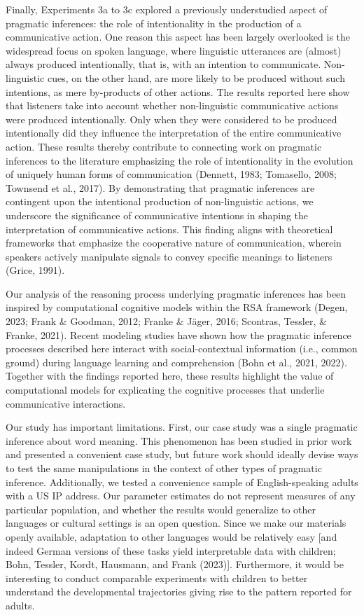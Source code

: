 \documentclass[
  man,floatsintext]{apa6}
\begin{document}
Finally, Experiments 3a to 3c explored a previously understudied aspect of pragmatic inferences: the role of intentionality in the production of a communicative action. One reason this aspect has been largely overlooked is the widespread focus on spoken language, where linguistic utterances are (almost) always produced intentionally, that is, with an intention to communicate. Non-linguistic cues, on the other hand, are more likely to be produced without such intentions, as mere by-products of other actions. The results reported here show that listeners take into account whether non-linguistic communicative actions were produced intentionally. Only when they were considered to be produced intentionally did they influence the interpretation of the entire communicative action. These results thereby contribute to connecting work on pragmatic inferences to the literature emphasizing the role of intentionality in the evolution of uniquely human forms of communication (Dennett, 1983; Tomasello, 2008; Townsend et al., 2017). By demonstrating that pragmatic inferences are contingent upon the intentional production of non-linguistic actions, we underscore the significance of communicative intentions in shaping the interpretation of communicative actions. This finding aligns with theoretical frameworks that emphasize the cooperative nature of communication, wherein speakers actively manipulate signals to convey specific meanings to listeners (Grice, 1991).

Our analysis of the reasoning process underlying pragmatic inferences has been inspired by computational cognitive models within the RSA framework (Degen, 2023; Frank \& Goodman, 2012; Franke \& Jäger, 2016; Scontras, Tessler, \& Franke, 2021). Recent modeling studies have shown how the pragmatic inference processes described here interact with social-contextual information (i.e., common ground) during language learning and comprehension (Bohn et al., 2021, 2022). Together with the findings reported here, these results highlight the value of computational models for explicating the cognitive processes that underlie communicative interactions.

Our study has important limitations. First, our case study was a single pragmatic inference about word meaning. This phenomenon has been studied in prior work and presented a convenient case study, but future work should ideally devise ways to test the same manipulations in the context of other types of pragmatic inference. Additionally, we tested a convenience sample of English-speaking adults with a US IP address. Our parameter estimates do not represent measures of any particular population, and whether the results would generalize to other languages or cultural settings is an open question. Since we make our materials openly available, adaptation to other languages would be relatively easy {[}and indeed German versions of these tasks yield interpretable data with children; Bohn, Tessler, Kordt, Hausmann, and Frank (2023){]}. Furthermore, it would be interesting to conduct comparable experiments with children to better understand the developmental trajectories giving rise to the pattern reported for adults.
\end{document}
